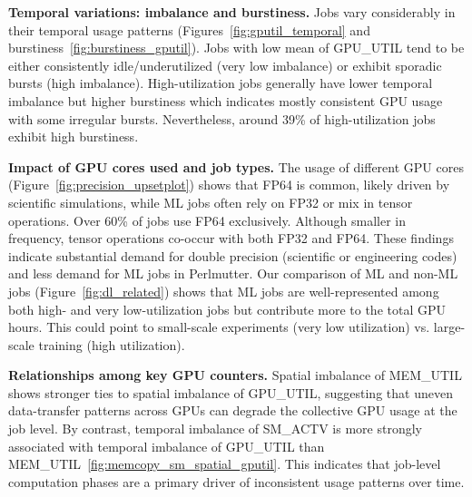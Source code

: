 \vspace{0.08in}
\noindent\textbf{Temporal variations: imbalance and burstiness.} Jobs vary considerably
in their temporal usage patterns (Figures~\ref{fig:gputil_temporal}
and burstiness~\ref{fig:burstiness_gputil}).  Jobs with low mean of GPU\_UTIL
tend to be either consistently idle/underutilized (very low imbalance)
or exhibit sporadic bursts (high imbalance). High-utilization jobs generally
have lower temporal imbalance but higher burstiness which indicates mostly
consistent GPU usage with some irregular bursts. Nevertheless,
around 39\% of high-utilization jobs exhibit high burstiness.

\vspace{0.08in}
\noindent\textbf{Impact of GPU cores used and job types.} The usage of different
GPU cores (Figure~\ref{fig:precision_upsetplot}) shows that FP64 is
common, likely driven by scientific simulations, while ML jobs often
rely on FP32 or mix in tensor operations.  Over 60\% of jobs use FP64
exclusively. Although smaller in frequency, tensor operations co-occur with
both FP32 and FP64.  These findings indicate substantial demand for double
precision (scientific or engineering codes) and less demand for ML jobs
in Perlmutter. Our comparison of ML and non-ML jobs
(Figure~\ref{fig:dl_related}) shows that ML jobs are well-represented among
both high- and very low-utilization jobs but contribute more to the total
GPU hours. This could point to small-scale
experiments (very low utilization) vs. large-scale training (high utilization).

\vspace{0.08in}
\noindent\textbf{Relationships among key GPU counters.}
Spatial imbalance of
MEM\_UTIL shows stronger ties to spatial imbalance of GPU\_UTIL, suggesting
that uneven data-transfer patterns across GPUs can degrade the collective GPU
usage at the job level. By contrast, temporal imbalance of
SM\_ACTV is more strongly associated with temporal imbalance of GPU\_UTIL
than MEM\_UTIL~\ref{fig:memcopy_sm_spatial_gputil}.
This indicates that job-level computation phases are a primary driver of
inconsistent usage patterns over time.


